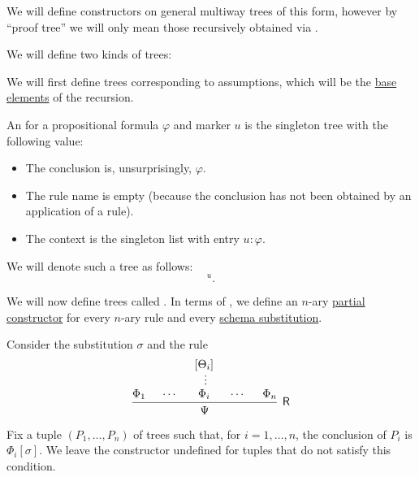 \begin{definition}
  We will define constructors on general multiway trees of this form, however by \enquote{proof tree} we will only mean those recursively obtained via .

  We will define two kinds of trees:
  \begin{thmenum}[resume=def:natural_deduction_proof_tree]
     We will first define trees corresponding to assumptions, which will be the \hyperref[thm:least_fixed_point_recursion/base]{base elements} of the recursion.

    An  for a propositional formula \( \varphi \) and marker \( u \) is the singleton tree with the following value:
    \begin{itemize}
      \item The conclusion is, unsurprisingly, \( \varphi \).
      \item The rule name is empty (because the conclusion has not been obtained by an application of a rule).
      \item The context is the singleton list with entry \( u: \varphi \).
    \end{itemize}

    We will denote such a tree as follows:
    \begin{equation*}
      [\varphi]^u.
    \end{equation*}

     We will now define trees called . In terms of , we define an \( n \)-ary \hyperref[thm:least_fixed_point_recursion/base]{partial constructor} for every \( n \)-ary rule and every \hyperref[def:propositional_schema_substitution]{schema substitution}.

    Consider the substitution \( \sigma \) and the rule
    \begin{equation*}
      \begin{prooftree}
        \hypo{ \Phi_1 }
        \hypo{ \cdots }
        \hypo{ [\Theta_i] }
        \ellipsis {} { \Phi_i }
        \hypo{ \cdots }
        \hypo{ \Phi_n }
        \infer5[\logic{R}]{ \Psi }
      \end{prooftree}
    \end{equation*}

    Fix a tuple \( (P_1, \ldots, P_n) \) of trees such that, for \( i = 1, \ldots, n \), the conclusion of \( P_i \) is \( \Phi_i[\sigma] \). We leave the constructor undefined for tuples that do not satisfy this condition.


\end{thmenum}
\end{definition}
